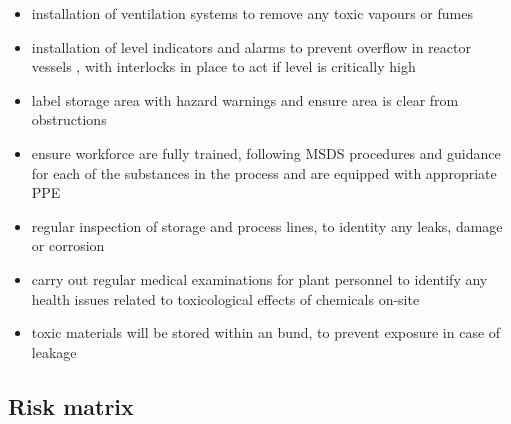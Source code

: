 \begin{itemize}
    \item installation of ventilation systems to remove any toxic vapours or fumes 
    \item installation of level indicators and alarms to prevent overflow in reactor vessels , with interlocks in place to act if level is critically high
    \item label storage area with hazard warnings and ensure area is clear from obstructions
    \item ensure workforce are fully trained, following MSDS procedures and guidance for each of the substances in the process and are equipped with appropriate PPE 
    \item regular inspection of storage and process lines, to identity any leaks, damage or corrosion 
    \item carry out regular medical examinations for plant personnel to identify any health issues related to toxicological effects of chemicals on-site
\item toxic materials will be stored within an bund, to prevent exposure in case of leakage
\end{itemize}



\subsection{Risk matrix}

